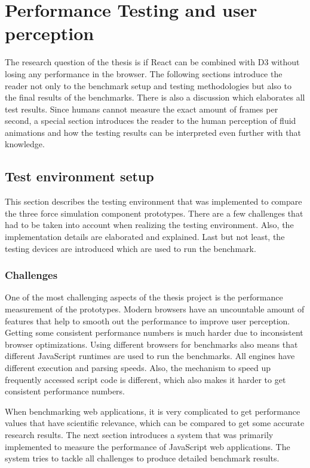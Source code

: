 \chapter{Performance Testing and user perception}
\label{cha:performance}

The research question of the thesis is if React can be combined with D3 without losing any performance in the browser. The following sections introduce the reader not only to the benchmark setup and testing methodologies but also to the final results of the benchmarks. There is also a discussion which elaborates all test results. Since humans cannot measure the exact amount of frames per second, a special section introduces the reader to the human perception of fluid animations and how the testing results can be interpreted even further with that knowledge.

\section{Test environment setup}

This section describes the testing environment that was implemented to compare the three force simulation component prototypes. There are a few challenges that had to be taken into account when realizing the testing environment. Also, the implementation details are elaborated and explained. Last but not least, the testing devices are introduced which are used to run the benchmark.

\subsection{Challenges}

One of the most challenging aspects of the thesis project is the performance measurement of the prototypes. Modern browsers have an uncountable amount of features that help to smooth out the performance to improve user perception. Getting some consistent performance numbers is much harder due to inconsistent browser optimizations. Using different browsers for benchmarks also means that different JavaScript runtimes are used to run the benchmarks. All engines have different execution and parsing speeds. Also, the mechanism to speed up frequently accessed script code is different, which also makes it harder to get consistent performance numbers.

When benchmarking web applications, it is very complicated to get performance values that have scientific relevance, which can be compared to get some accurate research results. The next section introduces a system that was primarily implemented to measure the performance of JavaScript web applications. The system tries to tackle all challenges to produce detailed benchmark results.

